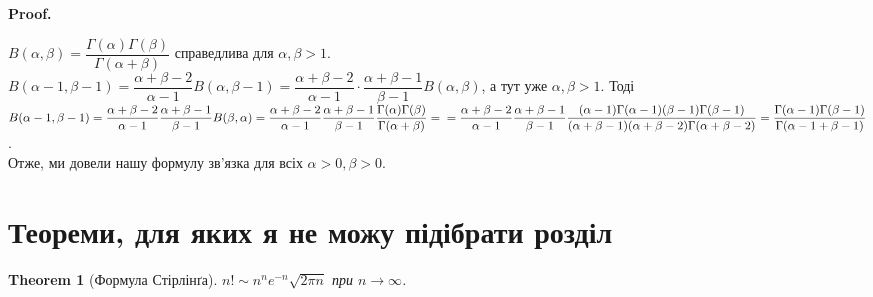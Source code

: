 \documentclass[a4paper, 10pt]{article}
\makeatletter
\def\qed{$\blacksquare$}
\theoremstyle{theoremdd}
\newtheorem{theorem}{Theorem}[subsection]
\theoremstyle{theoremdd}
\theoremstyle{theoremdd}
\theoremstyle{theoremdd}
\theoremstyle{theoremdd}
\theoremstyle{theoremdd}
\theoremstyle{theoremdd}
\theoremstyle{theoremdd}
\theoremstyle{theoremdd}
\renewenvironment{proof}[1][Proof.\\]{\par
\pushQED{\hfill \qed}%
\normalfont \topsep6\p@\@plus6\p@\relax
\trivlist
\item\relax
{\bfseries
#1\@addpunct{.}}\hspace\labelsep\ignorespaces
}{%
\popQED\endtrivlist\@endpefalse
}
\makeatother
\begin{document}
\begin{proof}
$B(\alpha,\beta) = \dfrac{\Gamma(\alpha) \Gamma(\beta)}{\Gamma(\alpha + \beta)}$ справедлива для $\alpha, \beta > 1$.
\bigskip \\
$B(\alpha-1,\beta-1) = \dfrac{\alpha+\beta-2}{\alpha-1} B(\alpha,\beta-1) = \dfrac{\alpha+\beta-2}{\alpha-1} \cdot \dfrac{\alpha+\beta-1}{\beta-1} B(\alpha,\beta)$, а тут уже $\alpha,\beta > 1$. Тоді\\
$B(\alpha-1,\beta-1) = \dfrac{\alpha+\beta-2}{\alpha-1} \dfrac{\alpha+\beta-1}{\beta-1} B(\beta,\alpha) = \dfrac{\alpha+\beta-2}{\alpha-1} \dfrac{\alpha+\beta-1}{\beta-1} \dfrac{\Gamma(\alpha) \Gamma(\beta)}{\Gamma(\alpha+\beta)} = \\
= \dfrac{\alpha+\beta-2}{\alpha-1} \dfrac{\alpha+\beta-1}{\beta-1} \dfrac{(\alpha-1)\Gamma(\alpha-1) (\beta-1) \Gamma(\beta-1)}{(\alpha+\beta-1)(\alpha+\beta-2) \Gamma(\alpha+\beta-2)} = \dfrac{\Gamma(\alpha-1) \Gamma(\beta-1)}{\Gamma(\alpha-1+\beta-1)}$.\\
Отже, ми довели нашу формулу зв'язка для всіх $\alpha>0,\beta>0$.
\end{proof}
\newpage

\iffalse
\section*{Теореми, для яких я не можу підібрати розділ}
\begin{theorem}[Формула Стірлінґа]
$n! \sim n^n e^{-n} \sqrt{2\pi n}$ при $n \to \infty$.
\end{theorem}
\end{document}
